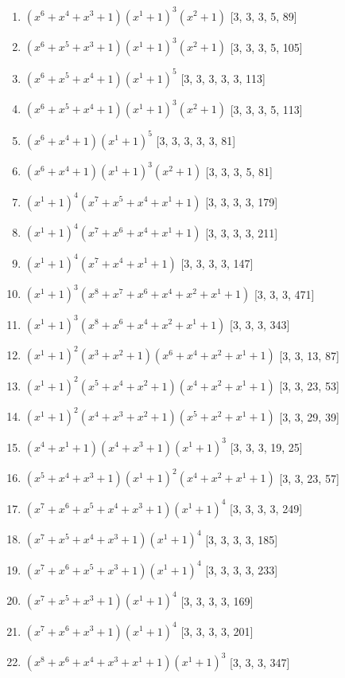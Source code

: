 \documentclass[10pt,twocolumn]{article}
\begin{document}
\begin{enumerate}
\item $(x^{6} + x^{4} + x^{3} + 1)(x^{1} + 1)^{3}(x^{2} + 1)$  [3, 3, 3, 5, 89]
\item $(x^{6} + x^{5} + x^{3} + 1)(x^{1} + 1)^{3}(x^{2} + 1)$  [3, 3, 3, 5, 105]
\item $(x^{6} + x^{5} + x^{4} + 1)(x^{1} + 1)^{5}$  [3, 3, 3, 3, 3, 113]
\item $(x^{6} + x^{5} + x^{4} + 1)(x^{1} + 1)^{3}(x^{2} + 1)$  [3, 3, 3, 5, 113]
\item $(x^{6} + x^{4} + 1)(x^{1} + 1)^{5}$  [3, 3, 3, 3, 3, 81]
\item $(x^{6} + x^{4} + 1)(x^{1} + 1)^{3}(x^{2} + 1)$  [3, 3, 3, 5, 81]
\item $(x^{1} + 1)^{4}(x^{7} + x^{5} + x^{4} + x^{1} + 1)$  [3, 3, 3, 3, 179]
\item $(x^{1} + 1)^{4}(x^{7} + x^{6} + x^{4} + x^{1} + 1)$  [3, 3, 3, 3, 211]
\item $(x^{1} + 1)^{4}(x^{7} + x^{4} + x^{1} + 1)$  [3, 3, 3, 3, 147]
\item $(x^{1} + 1)^{3}(x^{8} + x^{7} + x^{6} + x^{4} + x^{2} + x^{1} + 1)$  [3, 3, 3, 471]
\item $(x^{1} + 1)^{3}(x^{8} + x^{6} + x^{4} + x^{2} + x^{1} + 1)$  [3, 3, 3, 343]
\item $(x^{1} + 1)^{2}(x^{3} + x^{2} + 1)(x^{6} + x^{4} + x^{2} + x^{1} + 1)$  [3, 3, 13, 87]
\item $(x^{1} + 1)^{2}(x^{5} + x^{4} + x^{2} + 1)(x^{4} + x^{2} + x^{1} + 1)$  [3, 3, 23, 53]
\item $(x^{1} + 1)^{2}(x^{4} + x^{3} + x^{2} + 1)(x^{5} + x^{2} + x^{1} + 1)$  [3, 3, 29, 39]
\item $(x^{4} + x^{1} + 1)(x^{4} + x^{3} + 1)(x^{1} + 1)^{3}$  [3, 3, 3, 19, 25]
\item $(x^{5} + x^{4} + x^{3} + 1)(x^{1} + 1)^{2}(x^{4} + x^{2} + x^{1} + 1)$  [3, 3, 23, 57]
\item $(x^{7} + x^{6} + x^{5} + x^{4} + x^{3} + 1)(x^{1} + 1)^{4}$  [3, 3, 3, 3, 249]
\item $(x^{7} + x^{5} + x^{4} + x^{3} + 1)(x^{1} + 1)^{4}$  [3, 3, 3, 3, 185]
\item $(x^{7} + x^{6} + x^{5} + x^{3} + 1)(x^{1} + 1)^{4}$  [3, 3, 3, 3, 233]
\item $(x^{7} + x^{5} + x^{3} + 1)(x^{1} + 1)^{4}$  [3, 3, 3, 3, 169]
\item $(x^{7} + x^{6} + x^{3} + 1)(x^{1} + 1)^{4}$  [3, 3, 3, 3, 201]
\item $(x^{8} + x^{6} + x^{4} + x^{3} + x^{1} + 1)(x^{1} + 1)^{3}$  [3, 3, 3, 347]

\end{enumerate}
\end{document}
